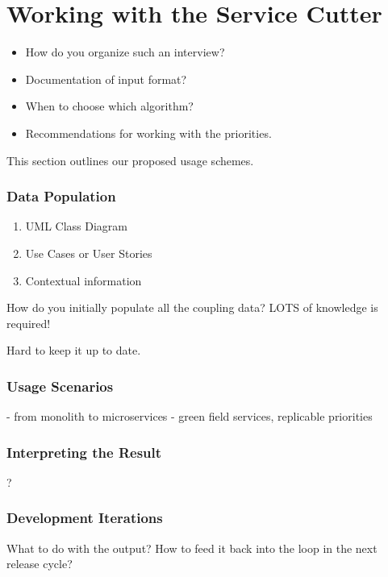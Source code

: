 \chapter{Working with the Service Cutter} 

\begin{itemize}
	\item How do you organize such an interview?
	\item Documentation of input format?
	\item When to choose which algorithm?
	\item Recommendations for working with the priorities.
\end{itemize}

This section outlines our proposed usage schemes.

\subsection{Data Population}

\begin{enumerate}
	\item UML Class Diagram
	\item Use Cases or User Stories
	\item Contextual information
\end{enumerate}

How do you initially populate all the coupling data? LOTS of knowledge is required!

Hard to keep it up to date.

\subsection{Usage Scenarios}

- from monolith to microservices
- green field services, replicable priorities

\subsection{Interpreting the Result}

?
\subsection{Development Iterations}

What to do with the output? How to feed it back into the loop in the next release cycle?
